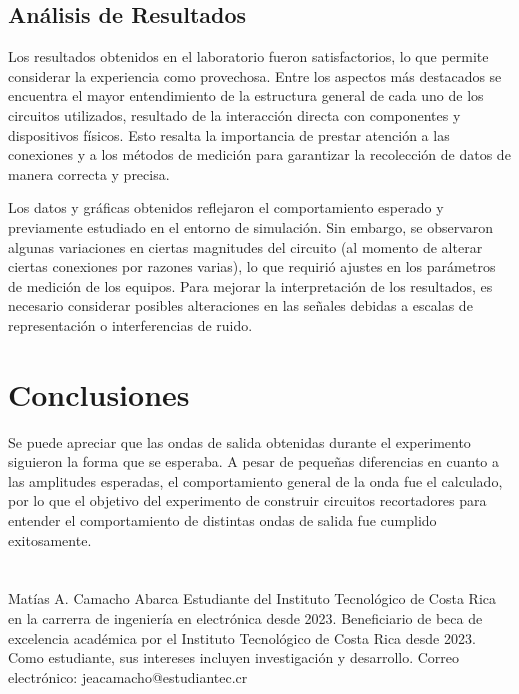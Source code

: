 \documentclass[journal]{IEEEtran}
\begin{document}
\subsection{Análisis de Resultados}
Los resultados obtenidos en el laboratorio fueron satisfactorios, lo que permite considerar la experiencia como provechosa. 
Entre los aspectos más destacados se encuentra el mayor entendimiento de la estructura general de cada uno de los circuitos utilizados, 
resultado de la interacción directa con componentes y dispositivos físicos. Esto resalta la importancia de prestar atención a las conexiones y a los 
métodos de medición para garantizar la recolección de datos de manera correcta y precisa.

Los datos y gráficas obtenidos reflejaron el comportamiento esperado y previamente estudiado en el entorno de simulación. 
Sin embargo, se observaron algunas variaciones en ciertas magnitudes del circuito (al momento de alterar ciertas conexiones por razones varias), 
lo que requirió ajustes en los parámetros de medición de los equipos. 
Para mejorar la interpretación de los resultados, es necesario considerar posibles alteraciones en las señales debidas a escalas de 
representación o interferencias de ruido.

\section{Conclusiones}
Se puede apreciar que las ondas de salida obtenidas durante el experimento siguieron la forma que se esperaba. A pesar de pequeñas diferencias
en cuanto a las amplitudes esperadas, el comportamiento general de la onda fue el calculado, por lo que el objetivo del experimento de construir circuitos recortadores
para entender el comportamiento de distintas ondas de salida fue cumplido exitosamente.

\appendices

\section{}

 
\begin{IEEEbiographynophoto}{Matías A. Camacho Abarca}
        Estudiante del Instituto Tecnológico de Costa Rica en la carrerra de ingeniería en electrónica desde
        2023. Beneficiario de beca de excelencia académica por el Instituto Tecnológico de
        Costa Rica desde 2023. Como estudiante, sus
        intereses incluyen investigación y desarrollo.
        Correo electrónico: jeacamacho@estudiantec.cr
\end{IEEEbiographynophoto}
\end{document}
